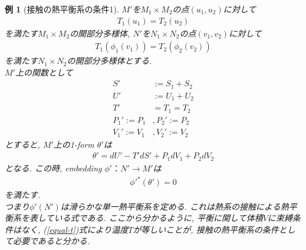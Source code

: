 \documentclass[a4paper,12pt]{ltjsarticle}
\theoremstyle{break}
\newtheorem{eg}[thm]{例}
\newcommand{\ti}{\times}
\numberwithin{equation}{section}
\begin{document}
\begin{eg}[接触の熱平衡系の条件1]
  $M'$を$M_1 \ti M_2$の点$(u_1,u_2)$に対して
  \begin{align*}
    T_1(u_1)=T_2(u_2)
  \end{align*}
  を満たす$M_1 \ti M_2$の開部分多様体, 
  $N'$を$N_1 \ti N_2$の点$(v_1,v_2)$に対して
  \begin{align}
    \label{equal-t}
    T_1(\phi_1(v_1))
    = T_2(\phi_2(v_2))
  \end{align}
  を満たす$N_1 \ti N_2$の開部分多様体とする. \\
  $M'$上の関数として
  \begin{align*}
    S' &:= S_1+S_2 \\
    U' &:= U_1+U_2 \\
    T' &= T_1 = T_2 \\
    P_1':=P_1 &, P_2':=P_2 \\
    V_1':=V_1 &, V_2':=V_2
  \end{align*}
  とすると, $M'$上の1-form $\theta'$は
  \begin{align*}
    \theta'
    =dU' - T'dS' + P_1dV_1 + P_2dV_2
  \end{align*}
  となる. 
  この時, embedding $\phi'：N' \to M'$は
  \begin{align*}
    \phi'^*(\theta')
    = 0
  \end{align*}
  を満たす. \\
  つまり$\phi'(N')$は滑らかな単一熱平衡系を定める. 
  これは熱系の接触による熱平衡系を表している式である.
  ここから分かるように, 平衡に関して体積$V$に束縛条件はなく, 
  (\ref{equal-t})式により温度$T$が等しいことが, 接触の熱平衡系の条件として必要であると分かる.  
\end{eg}  
\end{document}
